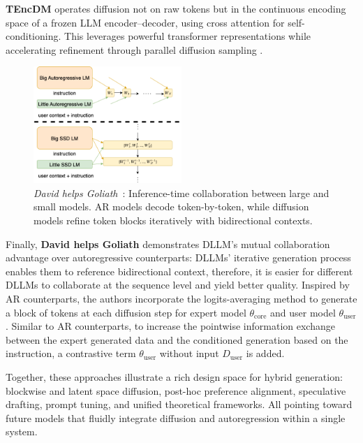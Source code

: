 \noindent \textbf{TEncDM} operates diffusion not on raw tokens but in the continuous encoding space of a frozen LLM encoder–decoder, using cross attention for self-conditioning. This leverages powerful transformer representations while accelerating refinement through parallel diffusion sampling \cite{shabalin_tencdm_2025}.  

\begin{figure}[h!]
    \centering
    \includegraphics[width=0.5\textwidth]{figs/david_helps_Goliath/david_helps_goliath.png}
    \caption[\textit{David helps Goliath} collaboration framework]{%
        \textit{David helps Goliath}~\cite{han_david_2024}: Inference-time collaboration between large and small models. 
        AR models decode token-by-token, while diffusion models refine token blocks iteratively with bidirectional contexts.%
    }
    \label{fig:david_helps_goliath}
\end{figure}

\noindent Finally, \textbf{David helps Goliath} demonstrates DLLM's mutual collaboration advantage over autoregressive counterparts: DLLMs' iterative generation process enables them to reference bidirectional context, therefore, it is easier for different DLLMs to collaborate at the sequence level and yield better quality. Inspired by AR counterparts, the authors incorporate the logits-averaging method to generate a block of tokens at each diffusion step for expert model $\theta_{\mathrm{core}}$ and user model $\theta_{\mathrm{user}}$. Similar to AR counterparts, to increase the pointwise information exchange between the expert generated data and the conditioned generation based on the instruction, a contrastive term $\theta_{\mathrm{user}}$ without input $D_{\text{user}}$ is added.\cite{han_david_2024}



\noindent Together, these approaches illustrate a rich design space for hybrid generation: blockwise and latent space diffusion, post-hoc preference alignment, speculative drafting, prompt tuning, and unified theoretical frameworks. All pointing toward future models that fluidly integrate diffusion and autoregression within a single system.
